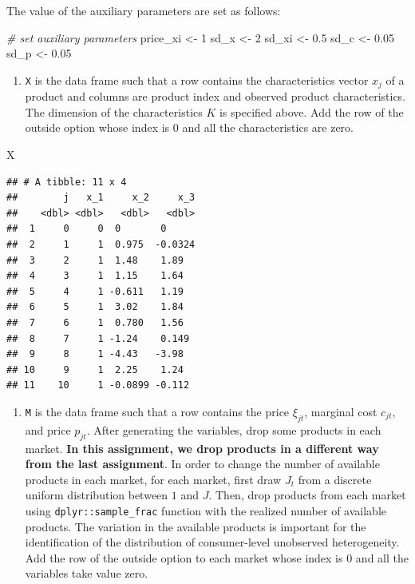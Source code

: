 \documentclass[
]{book}
\newenvironment{Shaded}{\begin{snugshade}}{\end{snugshade}}
\newcommand{\CommentTok}[1]{\textcolor[rgb]{0.56,0.35,0.01}{\textit{#1}}}
\newcommand{\DecValTok}[1]{\textcolor[rgb]{0.00,0.00,0.81}{#1}}
\newcommand{\FloatTok}[1]{\textcolor[rgb]{0.00,0.00,0.81}{#1}}
\newcommand{\NormalTok}[1]{#1}
\newcommand{\OtherTok}[1]{\textcolor[rgb]{0.56,0.35,0.01}{#1}}
\providecommand{\tightlist}{%
  \setlength{\itemsep}{0pt}\setlength{\parskip}{0pt}}
\begin{document}
The value of the auxiliary parameters are set as follows:

\begin{Shaded}
\begin{Highlighting}[]
\CommentTok{\# set auxiliary parameters}
\NormalTok{price\_xi }\OtherTok{\textless{}{-}} \DecValTok{1}
\NormalTok{sd\_x }\OtherTok{\textless{}{-}} \DecValTok{2}
\NormalTok{sd\_xi }\OtherTok{\textless{}{-}} \FloatTok{0.5}
\NormalTok{sd\_c }\OtherTok{\textless{}{-}} \FloatTok{0.05}
\NormalTok{sd\_p }\OtherTok{\textless{}{-}} \FloatTok{0.05}
\end{Highlighting}
\end{Shaded}

\begin{enumerate}
\def\labelenumi{\arabic{enumi}.}
\setcounter{enumi}{1}
\tightlist
\item
  \texttt{X} is the data frame such that a row contains the characteristics vector \(x_{j}\) of a product and columns are product index and observed product characteristics. The dimension of the characteristics \(K\) is specified above. Add the row of the outside option whose index is \(0\) and all the characteristics are zero.
\end{enumerate}

\begin{Shaded}
\begin{Highlighting}[]
\NormalTok{X}
\end{Highlighting}
\end{Shaded}

\begin{verbatim}
## # A tibble: 11 x 4
##        j   x_1     x_2     x_3
##    <dbl> <dbl>   <dbl>   <dbl>
##  1     0     0  0       0     
##  2     1     1  0.975  -0.0324
##  3     2     1  1.48    1.89  
##  4     3     1  1.15    1.64  
##  5     4     1 -0.611   1.19  
##  6     5     1  3.02    1.84  
##  7     6     1  0.780   1.56  
##  8     7     1 -1.24    0.149 
##  9     8     1 -4.43   -3.98  
## 10     9     1  2.25    1.24  
## 11    10     1 -0.0899 -0.112
\end{verbatim}

\begin{enumerate}
\def\labelenumi{\arabic{enumi}.}
\setcounter{enumi}{2}
\tightlist
\item
  \texttt{M} is the data frame such that a row contains the price \(\xi_{jt}\), marginal cost \(c_{jt}\), and price \(p_{jt}\). After generating the variables, drop some products in each market. \textbf{In this assignment, we drop products in a different way from the last assignment}. In order to change the number of available products in each market, for each market, first draw \(J_t\) from a discrete uniform distribution between \(1\) and \(J\). Then, drop products from each market using \texttt{dplyr::sample\_frac} function with the realized number of available products. The variation in the available products is important for the identification of the distribution of consumer-level unobserved heterogeneity. Add the row of the outside option to each market whose index is \(0\) and all the variables take value zero.
\end{enumerate}
\end{document}
